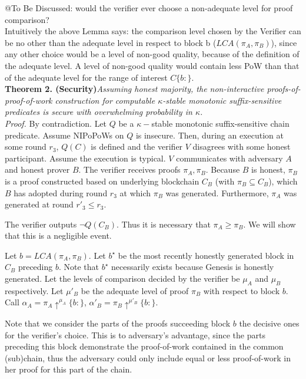 @To Be Discussed: would the verifier ever choose a non-adequate level for proof comparison? \\
Intuitively the above Lemma says: the comparison level chosen by the Verifier can be no other than the adequate level in respect to block b ($LCA(\pi_A, \pi_B)$), since any other choice would be a level of non-good quality, because of the definition of the adequate level. A level of non-good quality would contain less PoW than that of the adequate level for the range of interest $C\{b:\}$. \\


\textbf{Theorem 2. (Security)}\textit{Assuming honest majority, the non-interactive proofs-of-proof-of-work construction for computable $\kappa$-stable monotonic suffix-sensitive predicates is secure with overwhelming probability in $\kappa$.}\\

\textit{Proof.} By contradiction. Let $Q$ be a $\kappa-$stable monotonic suffix-sensitive chain predicate. Assume NIPoPoWs on $Q$ is insecure. Then, during an execution at some round  $r_3$, $Q(C)$ is defined and the verifier $V$ disagrees with some honest participant. Assume the execution is typical. $V$ communicates with adversary $A$ and honest prover $B$. The verifier receives proofs $\pi_A, \pi_B$. Because $B$ is honest, $\pi_B$ is a proof constructed based on underlying blockchain $C_B$ (with $\pi_B \subseteq C_B$), which $B$ has adopted during round $r_3$ at which $\pi_B$ was generated. Furthermore, $\pi_A$ was generated at round $r'_3 \leq r_3$.

The verifier outputs $\neg Q(C_B)$. Thus it is necessary that $\pi_A \geq \pi_B$. We will show that this is a negligible event. 

Let $b = LCA(\pi_A, \pi_B)$. Let $b^\star$ be the most recently honestly generated block in $C_B$ preceding $b$. Note that $b^\star$ necessarily exists because Genesis is honestly generated. Let the levels of comparison decided by the verifier be $\mu_A$ and $\mu_B$ respectively. Let $\mu'_B$ be the adequate level of proof $\pi_B$  with respect to block $b$. Call $\alpha_A = \pi_A \uparrow^{\mu_A}\{b:\}$, 
$\alpha'_B = \pi_B \uparrow^{\mu'_B}\{b:\}$.

Note that we consider the parts of the proofs succeeding block $b$ the decisive ones for the verifier's choice. This is to adversary's advantage, since the parts preceding this block demonstrate the proof-of-work contained in the common (sub)chain, thus the adversary could only include equal or less proof-of-work in her proof for this part of the chain.

